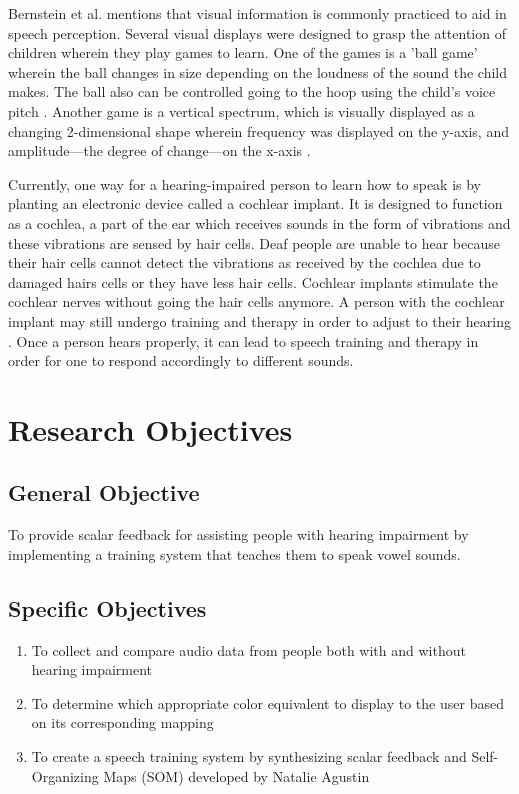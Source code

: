 Bernstein et al. \citeyear{bernstein:1988:STA} mentions that visual information is commonly practiced to aid in speech perception. Several visual displays were designed to grasp the attention of children wherein they play games to learn. One of the games is a 'ball game' wherein the ball changes in size depending on the loudness of the sound the child makes. The ball also can be controlled going to the hoop using the child's voice pitch \cite{bernstein:1988:STA}. Another game is a vertical spectrum, which is visually displayed as a changing 2-dimensional shape wherein frequency was displayed on the y-axis, and amplitude—the degree of change—on the x-axis \cite{bernstein:1988:STA}.

Currently, one way for a hearing-impaired person to learn how to speak is by planting an electronic device called a cochlear implant. It is designed to function as a cochlea, a part of the ear which receives sounds in the form of vibrations and these vibrations are sensed by hair cells. Deaf people are unable to hear because their hair cells cannot detect the vibrations as received by the cochlea due to damaged hairs cells or they have less hair cells. Cochlear implants stimulate the cochlear nerves without going the hair cells anymore. A person with the cochlear implant may still undergo training and therapy in order to adjust to their hearing \cite{blume:2009:AE}. Once a person hears properly, it can lead to speech training and therapy in order for one to respond accordingly to different sounds.

\section{Research Objectives}
\label{sec:researchobjectives}

\subsection{General Objective}
\label{sec:generalobjective}

To provide scalar feedback for assisting people with hearing impairment by implementing a training system that teaches them to speak vowel sounds.

\subsection{Specific Objectives}
\label{sec:specificobjectives}

\begin{enumerate}
\item To collect and compare audio data from people both with and without hearing impairment
\item To determine which appropriate color equivalent to display to the user based on its corresponding mapping
\item To create a speech training system by synthesizing scalar feedback and Self-Organizing Maps (SOM) developed by Natalie Agustin \citeyear{agustin:2014:SOM}
\end{enumerate}

